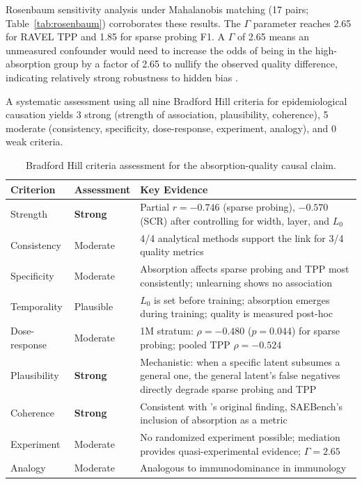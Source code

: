 \documentclass{article}
\begin{document}
Rosenbaum sensitivity analysis under Mahalanobis matching (17 pairs; Table~\ref{tab:rosenbaum}) corroborates these results.
The $\Gamma$ parameter reaches 2.65 for RAVEL TPP and 1.85 for sparse probing F1.
A $\Gamma$ of 2.65 means an unmeasured confounder would need to increase the odds of being in the high-absorption group by a factor of 2.65 to nullify the observed quality difference, indicating relatively strong robustness to hidden bias \citep{rosenbaum2002observational}.

A systematic assessment using all nine Bradford Hill criteria for epidemiological causation \citep{hill1965environment} yields 3 strong (strength of association, plausibility, coherence), 5 moderate (consistency, specificity, dose-response, experiment, analogy), and 0 weak criteria.

\begin{table}[t]
\caption{Bradford Hill criteria assessment for the absorption-quality causal claim.}
\label{tab:bradford}
\centering
\small
\begin{tabular}{@{}llp{7cm}@{}}
\toprule
Criterion & Assessment & Key Evidence \\
\midrule
Strength & \textbf{Strong} & Partial $r = -0.746$ (sparse probing), $-0.570$ (SCR) after controlling for width, layer, and $L_0$ \\
Consistency & Moderate & 4/4 analytical methods support the link for 3/4 quality metrics \\
Specificity & Moderate & Absorption affects sparse probing and TPP most consistently; unlearning shows no association \\
Temporality & Plausible & $L_0$ is set before training; absorption emerges during training; quality is measured post-hoc \\
Dose-response & Moderate & 1M stratum: $\rho = -0.480$ ($p = 0.044$) for sparse probing; pooled TPP $\rho = -0.524$ \\
Plausibility & \textbf{Strong} & Mechanistic: when a specific latent subsumes a general one, the general latent's false negatives directly degrade sparse probing and TPP \\
Coherence & \textbf{Strong} & Consistent with \citet{chanin2024absorption}'s original finding, SAEBench's inclusion of absorption as a metric \\
Experiment & Moderate & No randomized experiment possible; mediation provides quasi-experimental evidence; $\Gamma = 2.65$ \\
Analogy & Moderate & Analogous to immunodominance in immunology \\
\bottomrule
\end{tabular}
\end{table}
\end{document}
